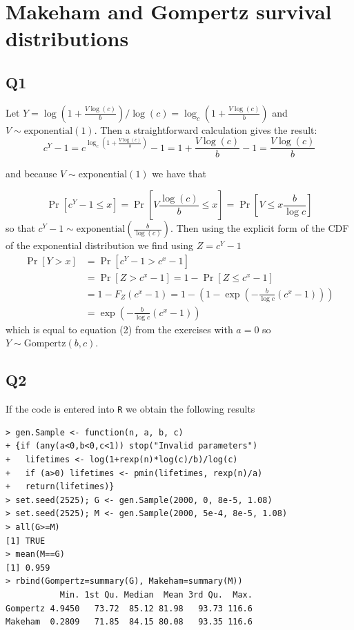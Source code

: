 
\section*{Makeham and Gompertz survival distributions}

\subsection*{Q1}

Let $Y = \log(1+\frac{V \log(c)}{b}) / \log(c) = \log_c(1+\frac{V \log(c)}{b})$ and $V \sim \text{exponential}(1)$. Then a straightforward calculation gives the result:
\begin{equation}
c^Y - 1 = c^{ \log_c(1+\frac{V \log(c)}{b})} - 1 = 1+\frac{V\log(c)}{b} - 1 = \frac{V \log(c)}{b}
\end{equation}

and because $V \sim \text{exponential}(1)$ we have that

\begin{equation}
\Pr[c^Y - 1 \le x ] = \Pr[V \frac{\log(c)}{b} \le x ] = \Pr[V \le x \frac{b}{\log{c}}] 
\end{equation}
so that $c^Y - 1 \sim \text{exponential}( \frac{b}{\log(c)})$. Then using the explicit form of the CDF of the exponential distribution we find using $Z = c^Y - 1 $
\begin{equation}
\begin{split}
\Pr[Y > x] & = \Pr[c^Y - 1 > c^x - 1] \\ 
		 & = \Pr[Z > c^x - 1] = 1- \Pr[Z \le c^x - 1]  \\
		 & = 1 - F_Z(c^x - 1) = 1 - (1-\exp(-\frac{b}{\log c} (c^x - 1))) \\
	     & = \exp(-\frac{b}{\log c} (c^x - 1))
\end{split}
\end{equation}
which is equal to equation (2) from the exercises with $a = 0$ so $ Y \sim \text{Gompertz}(b,c)$.

\subsection*{Q2}
If the code is entered into \verb|R| we obtain the following results
\begin{verbatim}
> gen.Sample <- function(n, a, b, c)
+ {if (any(a<0,b<0,c<1)) stop("Invalid parameters")
+   lifetimes <- log(1+rexp(n)*log(c)/b)/log(c)
+   if (a>0) lifetimes <- pmin(lifetimes, rexp(n)/a)
+   return(lifetimes)}
> set.seed(2525); G <- gen.Sample(2000, 0, 8e-5, 1.08)
> set.seed(2525); M <- gen.Sample(2000, 5e-4, 8e-5, 1.08)
> all(G>=M) 
[1] TRUE
> mean(M==G) 
[1] 0.959
> rbind(Gompertz=summary(G), Makeham=summary(M))
           Min. 1st Qu. Median  Mean 3rd Qu.  Max.
Gompertz 4.9450   73.72  85.12 81.98   93.73 116.6
Makeham  0.2809   71.85  84.15 80.08   93.35 116.6
\end{verbatim}

